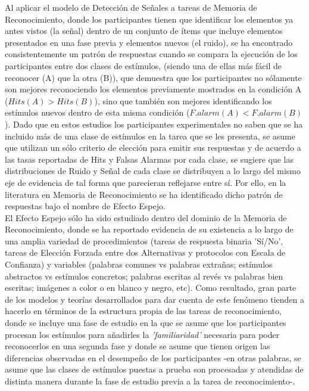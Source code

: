 Al aplicar el modelo de Detección de Señales a tareas de Memoria de Reconocimiento, donde los participantes tienen que identificar los elementos ya antes vistos (la señal) dentro de un conjunto de ítems que incluye elementos presentados en una fase previa y elementos nuevos (el ruido), se ha encontrado consistentemente un patrón de respuestas cuando se compara la ejecución de los participantes entre dos clases de estímulos, (siendo una de ellas más fácil de reconocer (A) que la otra (B)), que demuestra que los participantes no sólamente son mejores reconociendo los elementos previamente mostrados en la condición A ($Hits(A)>Hits(B)$), sino que también son mejores identificando los estímulos nuevos dentro de esta misma condición ($F.alarm(A)<F.alarm(B)$). Dado que en estos estudios los participantes experimentales no saben que se ha incluido más de una clase de estímulos en la tarea que se les presenta, se asume que utilizan un sólo criterio de elección para emitir sus respuestas y de acuerdo a las tasas reportadas de Hits y Falsas Alarmas por cada clase, se sugiere que las distribuciones de Ruido y Señal de cada clase se distribuyen a lo largo del mismo eje de evidencia de tal forma que parecieran reflejarse entre sí. Por ello, en la literatura en Memoria de Reconocimiento se ha identificado dicho patrón de respuestas bajo el nombre de Efecto Espejo.\\

El Efecto Espejo sólo ha sido estudiado dentro del dominio de la Memoria de Reconocimiento, donde se ha reportado evidencia de su existencia a lo largo de una amplia variedad de procedimientos (tareas de respuesta binaria 'Sí/No', tareas de Elección Forzada entre dos Alternativas y protocolos con Escala de Confianza) y variables (palabras comunes vs palabras extrañas; estímulos abstractos vs estímulos concretos; palabras escritas al revés vs palabras bien escritas; imágenes a color o en blanco y negro, etc). Como resultado, gran parte de los modelos y teorías desarrollados para dar cuenta de este fenómeno tienden a hacerlo en términos de la estructura propia de las tareas de reconocimiento, donde se incluye una fase de estudio en la que se asume que los participantes procesan los estímulos para añadirles la \textit{'familiaridad'} necesaria para poder reconocerlos en una segunda fase y donde se asume que tienen origen las diferencias observadas en el desempeño de los participantes -en otras palabras, se asume que las clases de estímulos puestas a prueba son procesadas y atendidas de distinta manera durante la fase de estudio previa a la tarea de reconocimiento-.\\

